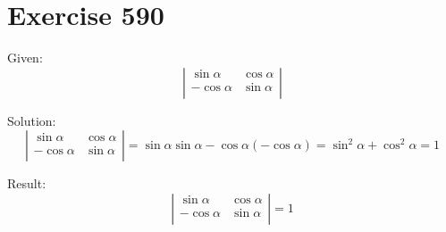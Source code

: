 \documentclass[a4paper, 10pt]{scrartcl}
\begin{document}
\section{Exercise 590}

Given:
\[
    \left|
        \begin{array}{cc}
            \sin{\alpha}  & \cos{\alpha}\\
            -\cos{\alpha} & \sin{\alpha}\\
        \end{array}
    \right|
\]

Solution:
\[
    \left|
        \begin{array}{cc}
            \sin{\alpha}  & \cos{\alpha}\\
            -\cos{\alpha} & \sin{\alpha}\\
        \end{array}
    \right| = \sin{\alpha}\sin{\alpha} - \cos{\alpha}(-\cos{\alpha}) =
              \sin^{2}{\alpha} + \cos^{2}{\alpha} = 1
\]

Result:
\[
    \left|
        \begin{array}{cc}
            \sin{\alpha}  & \cos{\alpha}\\
            -\cos{\alpha} & \sin{\alpha}\\
        \end{array}
    \right| = 1
\]
\end{document}
